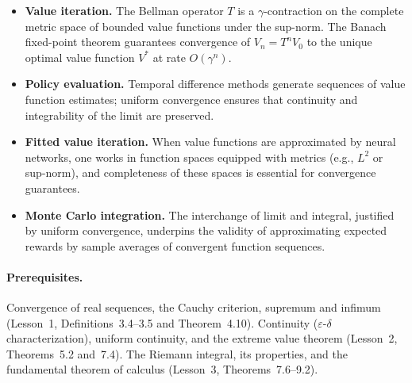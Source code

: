 \documentclass[11pt,a4paper]{article}
\begin{document}
\begin{rlconnection}[title={Why RL/ML needs function sequences and metric spaces}]
\begin{itemize}[nosep]
  \item \textbf{Value iteration.} The Bellman operator $T$ is a
    $\gamma$-contraction on the complete metric space of bounded value
    functions under the sup-norm. The Banach fixed-point theorem
    guarantees convergence of $V_n = T^n V_0$ to the unique optimal
    value function $V^*$ at rate $O(\gamma^n)$.
  \item \textbf{Policy evaluation.} Temporal difference methods generate
    sequences of value function estimates; uniform convergence ensures
    that continuity and integrability of the limit are preserved.
  \item \textbf{Fitted value iteration.} When value functions are
    approximated by neural networks, one works in function spaces
    equipped with metrics (e.g., $L^2$ or sup-norm), and completeness
    of these spaces is essential for convergence guarantees.
  \item \textbf{Monte Carlo integration.} The interchange of limit and
    integral, justified by uniform convergence, underpins the validity
    of approximating expected rewards by sample averages of convergent
    function sequences.
\end{itemize}
\end{rlconnection}

\paragraph{Prerequisites.}
Convergence of real sequences, the Cauchy criterion, supremum and
infimum (Lesson~1, Definitions~3.4--3.5 and Theorem~4.10). Continuity
($\varepsilon$-$\delta$ characterization), uniform continuity, and the
extreme value theorem (Lesson~2, Theorems~5.2 and~7.4). The Riemann
integral, its properties, and the fundamental theorem of calculus
(Lesson~3, Theorems~\mbox{7.6--9.2}).
\end{document}

